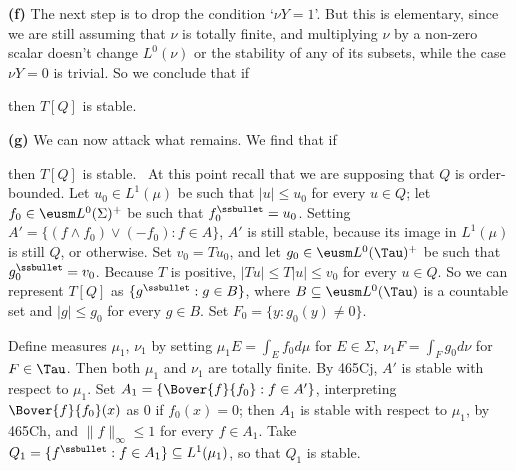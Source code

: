 {\medskip

{\bf (f)} The next step is to drop the condition `$\nu Y=1$'.   But this
is elementary, since we are still assuming that $\nu$ is totally finite,
and multiplying $\nu$ by a non-zero scalar doesn't change $L^0(\nu)$ or
the stability of any of its subsets, while the case $\nu Y=0$ is
trivial.   So we conclude that if


\noindent then $T[Q]$ is stable.

\medskip

{\bf (g)} We can now attack what remains.   We find that if


\noindent then $T[Q]$ is stable.   \Prf\ At this point recall that we
are supposing that $Q$ is order-bounded.   Let $u_0\in L^1(\mu)$ be such
that $|u|\le u_0$ for every $u\in Q$;  let $f_0\in\eusm L^0(\Sigma)^+$
be such that $f_0^{\ssbullet}=u_0$.   Setting
$A'=\{(f\wedge f_0)\vee(-f_0):f\in A\}$, $A'$ is still stable, because
its image in $L^1(\mu)$ is still $Q$, or otherwise.
Set $v_0=Tu_0$, and let $g_0\in\eusm L^0(\Tau)^+$ be such that
$g_0^{\ssbullet}=v_0$.   Because $T$ is positive, $|Tu|\le T|u|\le v_0$
for every $u\in Q$.   So we can represent $T[Q]$ as
$\{g^{\ssbullet}:g\in B\}$, where $B\subseteq\eusm L^0(\Tau)$ is a
countable set and $|g|\le g_0$ for every $g\in B$.   Set
$F_0=\{y:g_0(y)\ne 0\}$.

Define measures $\mu_1$, $\nu_1$ by setting $\mu_1E=\int_Ef_0d\mu$ for
$E\in\Sigma$, $\nu_1F=\int_Fg_0d\nu$ for $F\in\Tau$.   Then both $\mu_1$
and $\nu_1$ are totally finite.   By 465Cj, $A'$ is stable with respect
to $\mu_1$.   Set $A_1=\{\Bover{f}{f_0}:f\in A'\}$, interpreting
$\Bover{f}{f_0}(x)$ as $0$ if $f_0(x)=0$;  then $A_1$ is stable with
respect to $\mu_1$, by 465Ch, and $\|f\|_{\infty}\le 1$ for every
$f\in A_1$.   Take $Q_1=\{f^{\ssbullet}:f\in A_1\}\subseteq L^1(\mu_1)$,
so that $Q_1$ is stable.

}
